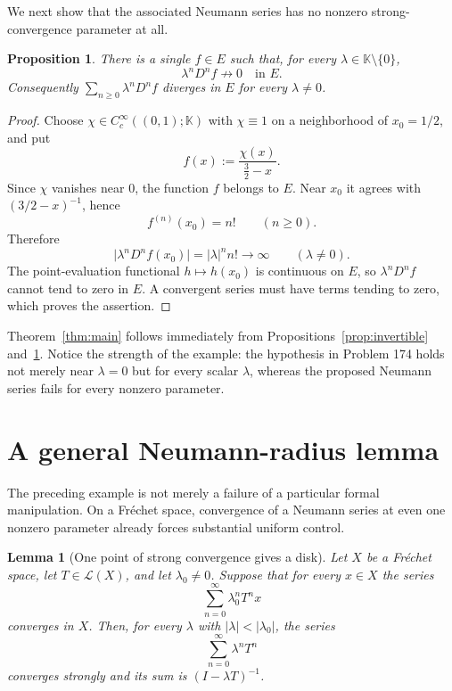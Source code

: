 \documentclass[11pt]{article}
\newtheorem{proposition}[theorem]{Proposition}
\newtheorem{lemma}[theorem]{Lemma}
\theoremstyle{remark}
\newcommand{\K}{\mathbb K}
\newcommand{\Lcal}{\mathcal L}
\begin{document}
We next show that the associated Neumann series has no nonzero strong-convergence
parameter at all.

\begin{proposition}\label{prop:divergence}
There is a single $f\in E$ such that, for every $\lambda\in\K\setminus\{0\}$,
\[
  \lambda^nD^nf\not\longrightarrow0\quad\text{in }E.
\]
Consequently $\sum_{n\ge0}\lambda^nD^nf$ diverges in $E$ for every $\lambda\neq0$.
\end{proposition}

\begin{proof}
Choose $\chi\in C_c^\infty((0,1);\K)$ with $\chi\equiv1$ on a neighborhood of
$x_0=1/2$, and put
\[
   f(x):=\frac{\chi(x)}{\frac32-x}.
\]
Since $\chi$ vanishes near $0$, the function $f$ belongs to $E$.  Near $x_0$ it agrees
with $(3/2-x)^{-1}$, hence
\[
   f^{(n)}(x_0)=n!\qquad(n\ge0).
\]
Therefore
\[
   \bigl|\lambda^nD^nf(x_0)\bigr|=|\lambda|^n n!\longrightarrow\infty
   \qquad(\lambda\neq0).
\]
The point-evaluation functional $h\mapsto h(x_0)$ is continuous on $E$, so
$\lambda^nD^nf$ cannot tend to zero in $E$.  A convergent series must have terms tending
to zero, which proves the assertion.
\end{proof}

Theorem~\ref{thm:main} follows immediately from
Propositions~\ref{prop:invertible} and~\ref{prop:divergence}.  Notice the strength of the
example: the hypothesis in Problem 174 holds not merely near $\lambda=0$ but for every
scalar $\lambda$, whereas the proposed Neumann series fails for every nonzero parameter.

\section{A general Neumann-radius lemma}

The preceding example is not merely a failure of a particular formal manipulation.  On a
Fr\'echet space, convergence of a Neumann series at even one nonzero parameter already
forces substantial uniform control.

\begin{lemma}[One point of strong convergence gives a disk]\label{lem:disk}
Let $X$ be a Fr\'echet space, let $T\in\Lcal(X)$, and let $\lambda_0\neq0$.  Suppose that
for every $x\in X$ the series
\[
   \sum_{n=0}^{\infty}\lambda_0^nT^nx
\]
converges in $X$.  Then, for every $\lambda$ with $|\lambda|<|\lambda_0|$, the series
\[
   \sum_{n=0}^{\infty}\lambda^nT^n
\]
converges strongly and its sum is $(I-\lambda T)^{-1}$.
\end{lemma}
\end{document}
